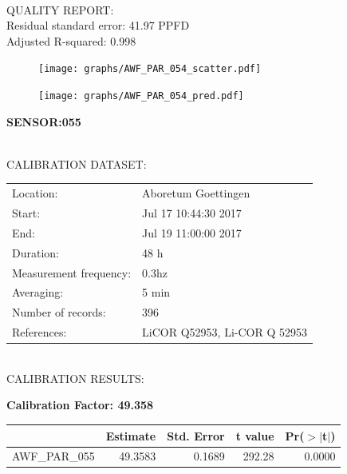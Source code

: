 \documentclass[oneside]{report}
\begin{document}
\hrulefill\\
QUALITY REPORT:\\
Residual standard error: 41.97 PPFD\\
Adjusted R-squared: 0.998



\begin{figure}[H]
  \centering
  \texttt{[image: graphs/AWF\_PAR\_054\_scatter.pdf]}
\end{figure}




\begin{figure}[H]
  \centering
  \texttt{[image: graphs/AWF\_PAR\_054\_pred.pdf]}
\end{figure}

\pagebreak


\begin{center}
\large{\textbf{SENSOR:055}}\\
\end{center}

\hrulefill\\
CALIBRATION DATASET:\\
\begin{table}[h!]
  \centering
  \label{tab:table1}
  \begin{tabular}{ll}
    Location: & Aboretum Goettingen\\ 
    
    
    Start:  & Jul 17 10:44:30 2017 \\
    End:   & Jul 19 11:00:00 2017\\ 
    Duration: & 48 h\\
    Measurement frequency: & 0.3hz\\
    Averaging:  &5 min\\
    Number of records: & 396 \\
    References: & LiCOR Q52953, Li-COR Q 52953 \\
  \end{tabular}
\end{table}

\hrulefill\\
CALIBRATION RESULTS:\\


\begin{center}
\textbf{\large{Calibration Factor: 49.358}}\\
\end{center}
\begin{table}[ht]
\centering
\begin{tabular}{rrrrr}
  \hline
 & Estimate & Std. Error & t value & Pr($>$$|$t$|$) \\ 
  \hline
AWF\_PAR\_055 & 49.3583 & 0.1689 & 292.28 & 0.0000 \\ 
   \hline
\end{tabular}
\end{table}
\end{document}
